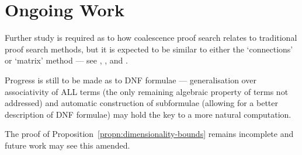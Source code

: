     \section*{Ongoing Work}
        Further study is required as to how coalescence proof search relates to traditional proof search methods, but it is expected to be similar to either the `connections' or `matrix' method --- see \citet{tableaux-for-logic-of-proofs}, \citet{matrices-with-connections}, \citet{connection-based-proof-method} and \citet{proving-by-matings}.
        
        Progress is still to be made as to DNF formulae --- generalisation over associativity of ALL terms (the only remaining algebraic property of terms not addressed) and automatic construction of subformulae (allowing for a better description of DNF formulae) may hold the key to a more natural computation.
        
        The proof of Proposition~\ref{propn:dimensionality-bounds} remains incomplete and future work may see this amended.
